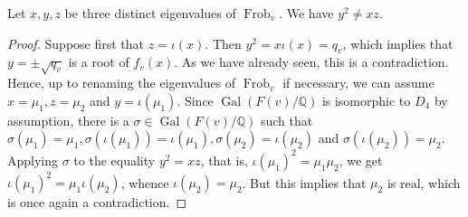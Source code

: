 \begin{lemma}\label{lemma:Nonzero}
Let $x,y,z$ be three distinct eigenvalues of $\operatorname{Frob}_v$. We have $y^2 \neq xz$.
\end{lemma}
\begin{proof}
Suppose first that $z=\iota(x)$. Then $y^2=x\iota(x)=q_v$, which implies that $y=\pm \sqrt{q_v}$ is a root of $f_v(x)$. As we have already seen, this is a contradiction. Hence, up to renaming the eigenvalues of $\operatorname{Frob}_v$ if necessary, we can assume $x=\mu_1, z=\mu_2$ and $y=\iota(\mu_1)$. Since $\operatorname{Gal}(F(v)/\mathbb{Q})$ is isomorphic to $D_4$ by assumption, there is a $\sigma \in \operatorname{Gal}(F(v)/\mathbb{Q})$ such that $\sigma(\mu_1)=\mu_1, \sigma(\iota(\mu_1))=\iota(\mu_1), \sigma(\mu_2)=\iota(\mu_2)$ and $\sigma(\iota(\mu_2))=\mu_2$. Applying $\sigma$ to the equality $y^2=xz$, that is, $\iota(\mu_1)^2=\mu_1\mu_2$, we get $\iota(\mu_1)^2=\mu_1\iota(\mu_2)$, whence $\iota(\mu_2)=\mu_2$. 
But this implies that $\mu_2$ is real, which is once again a contradiction.
\end{proof}

